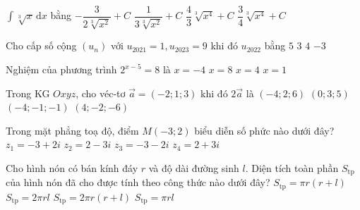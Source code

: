 \begin{ex}%
	$\displaystyle\int\limits\sqrt[3]{x}\mathrm{\,d}x$ bằng
	\choice
	{$-\dfrac{3}{2\sqrt[3]{x^2}}+C$}
	{$\dfrac{1}{3\sqrt[3]{x^2}}+C$}
	{$\dfrac{4}{3}\sqrt[3]{x^4}+C$}
	{\True $\dfrac{3}{4}\sqrt[3]{x^4}+C$}
\end{ex}
\begin{ex}%
	Cho cấp số cộng $(u_n)$ với $u_{2021}=1,u_{2023}=9$ khi đó  $u_{2022}$ bằng
	\choice
	{\True$5$}
	{$3$}
	{$4$}
	{$-3$}
\end{ex}
\begin{ex}%
	Nghiệm của phương trình $2^{x-5}=8$ là
	\choice
	{$x=-4$}
	{\True$x=8$}
	{$x=4$}
	{$x=1$}
\end{ex}
\begin{ex}%
	Trong KG $Oxyz$, cho véc-tơ $\overrightarrow{a}=(-2;1;3)$ khi đó $2\overrightarrow{a}$ là
	\choice
	{\True $(-4;2;6)$}
	{$(0;3;5)$}
	{$(-4;-1;-1)$}
	{$(4;-2;-6)$}
\end{ex}


\begin{ex}%
	Trong mặt phẳng toạ độ, điểm $M(-3 ; 2)$ biểu diễn số phức nào dưới đây?
	\choice 
	{\True $z_1=-3+2i$}
	{$z_2=2-3i$}
	{$z_3=-3-2i$}
	{$z_4=2+3i$}
\end{ex}



\begin{ex}%
	Cho hình nón có bán kính đáy $r$ và độ dài đường sinh $l$. Diện tích toàn phần $S_{\text{tp}}$ của hình nón đã cho được tính theo công thức nào dưới đây?
	\choice 
	{\True $S_{\text{tp}}=\pi r(r+l)$}
	{$S_{\text{tp}}=2 \pi r l$}
	{$S_{\text{tp}}=2 \pi r(r+l)$}
	{$S_{\text{tp}}=\pi rl$}
\end{ex}


